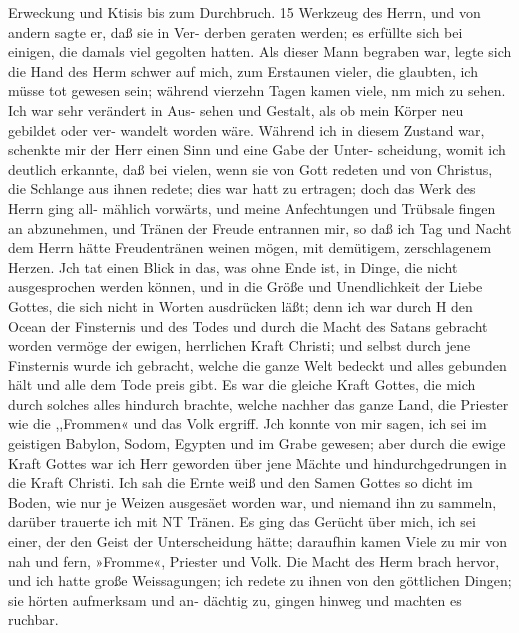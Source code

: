 Erweckung und Ktisis bis zum Durchbruch. 15
Werkzeug des Herrn, und von andern sagte er, daß sie in Ver-
derben geraten werden; es erfüllte sich bei einigen, die damals
viel gegolten hatten. Als dieser Mann begraben war, legte sich
die Hand des Herm schwer auf mich, zum Erstaunen vieler, die
glaubten, ich müsse tot gewesen sein; während vierzehn Tagen
kamen viele, nm mich zu sehen. Ich war sehr verändert in Aus-
sehen und Gestalt, als ob mein Körper neu gebildet oder ver-
wandelt worden wäre. Während ich in diesem Zustand war,
schenkte mir der Herr einen Sinn und eine Gabe der Unter-
scheidung, womit ich deutlich erkannte, daß bei vielen, wenn sie
von Gott redeten und von Christus, die Schlange aus ihnen redete;
dies war hatt zu ertragen; doch das Werk des Herrn ging all-
mählich vorwärts, und meine Anfechtungen und Trübsale fingen
an abzunehmen, und Tränen der Freude entrannen mir, so daß
ich Tag und Nacht dem Herrn hätte Freudentränen weinen mögen,
mit demütigem, zerschlagenem Herzen. Jch tat einen Blick in das,
was ohne Ende ist, in Dinge, die nicht ausgesprochen werden
können, und in die Größe und Unendlichkeit der Liebe Gottes,
die sich nicht in Worten ausdrücken läßt; denn ich war durch H
den Ocean der Finsternis und des Todes und durch die Macht
des Satans gebracht worden vermöge der ewigen, herrlichen Kraft
Christi; und selbst durch jene Finsternis wurde ich gebracht, welche
die ganze Welt bedeckt und alles gebunden hält und alle dem Tode
preis gibt. Es war die gleiche Kraft Gottes, die mich durch
solches alles hindurch brachte, welche nachher das ganze Land,
die Priester wie die ,,Frommen« und das Volk ergriff.
Jch konnte von mir sagen, ich sei im geistigen Babylon, Sodom,
Egypten und im Grabe gewesen; aber durch die ewige Kraft Gottes
war ich Herr geworden über jene Mächte und hindurchgedrungen
in die Kraft Christi. Ich sah die Ernte weiß und den Samen
Gottes so dicht im Boden, wie nur je Weizen ausgesäet worden
war, und niemand ihn zu sammeln, darüber trauerte ich mit NT
Tränen.
Es ging das Gerücht über mich, ich sei einer, der den Geist
der Unterscheidung hätte; daraufhin kamen Viele zu mir von nah
und fern, »Fromme«, Priester und Volk. Die Macht des Herm
brach hervor, und ich hatte große Weissagungen; ich redete zu
ihnen von den göttlichen Dingen; sie hörten aufmerksam und an-
dächtig zu, gingen hinweg und machten es ruchbar.



